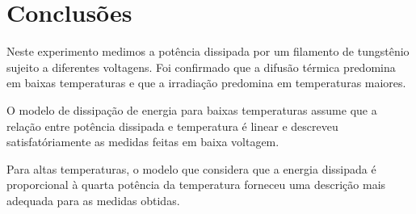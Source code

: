 \documentclass[brazilian,12pt,a4paper,final]{article}
\begin{document}
\section{Conclusões}
Neste experimento medimos a potência dissipada por um filamento de tungstênio
sujeito a diferentes voltagens. Foi confirmado que a difusão térmica predomina
em baixas temperaturas e que a irradiação predomina em temperaturas maiores.

O modelo de dissipação de energia para baixas temperaturas
assume que a relação entre potência dissipada e temperatura é linear
e descreveu satisfatóriamente as medidas feitas em baixa voltagem.

Para altas temperaturas, 
o modelo que considera que 
a energia dissipada é proporcional à quarta potência da temperatura 
forneceu uma descrição mais adequada para as medidas obtidas.




\end{document}
